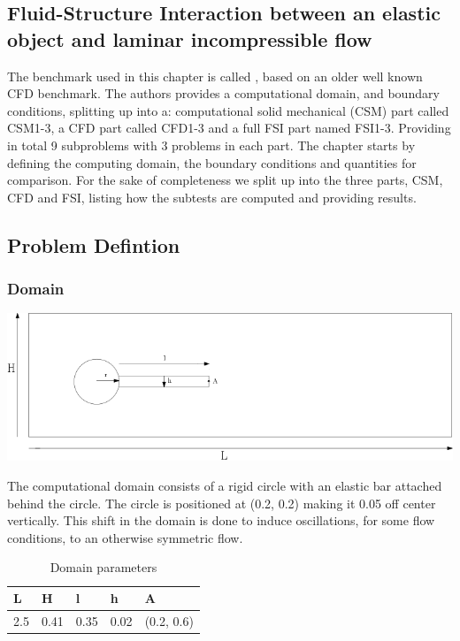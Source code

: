 \subsection{Fluid-Structure Interaction between an elastic object and laminar incompressible flow} \label{sec:HronTurek}
The benchmark used in this chapter is called  \cite{Hron2006a}, based on an older well known CFD benchmark\cite{Turek1996}. 
The authors provides a computational domain, and boundary conditions, splitting up into a: computational solid mechanical (CSM) part called CSM1-3, a CFD part called CFD1-3 and a full FSI part named FSI1-3. Providing in total 9 subproblems with 3 problems in each part. The chapter starts by defining the computing domain, the boundary conditions and quantities for comparison. For the sake of completeness we split up into the three parts, CSM, CFD and FSI, listing how the subtests are computed and providing results.

\subsection*{Problem Defintion}
\subsubsection*{Domain}
\begin{center}
\includegraphics[scale=0.4]{./Verification_Validation/Hron_Turek/Domain_drawing.png}
\end{center}

The computational domain consists of a rigid circle with an elastic bar attached behind the circle. The circle is positioned at (0.2, 0.2) making it 0.05 off center vertically. This shift in the domain is done to induce oscillations, for some flow conditions, to an otherwise symmetric flow.

\begin{table}[H]
\centering
\caption{Domain parameters}
\label{my-label}
\begin{tabular}{|l|l|l|l|l|}
\hline
L & H & l & h & A \\ \hline
2.5 & 0.41 & 0.35 & 0.02 & (0.2, 0.6) \\ \hline
\end{tabular}
\end{table}

